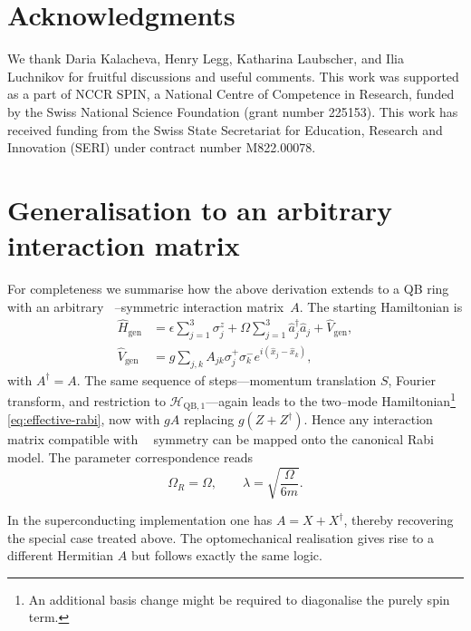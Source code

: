 \documentclass[reprint, aps, prx, amsmath, amssymb, longbibliography, superscriptaddress]{revtex4-2}
\DeclareMathOperator{\Zthree}{\mathbb{Z}_3}
\begin{document}
\section*{Acknowledgments} 

We thank Daria Kalacheva, Henry Legg, Katharina Laubscher, and Ilia Luchnikov for fruitful discussions and useful comments. This work was supported as a part of NCCR SPIN, a National Centre of Competence in Research, funded by the Swiss National Science Foundation (grant number 225153). This work has received funding from the Swiss State Secretariat for Education, Research and Innovation (SERI) under contract number M822.00078.


\appendix

\section{Generalisation to an arbitrary interaction matrix}
\label{app:arbitrary-interaction-summary}

For completeness we summarise how the above derivation extends to a QB ring
with an arbitrary $\Zthree$--symmetric interaction matrix~$A$.  The starting
Hamiltonian is
\begin{equation}
\label{eq:arbitary-interaction-hamiltonian}
  \begin{aligned}
    \hat H_{\text{gen}} &= \epsilon \sum_{j=1}^{3} \sigma_j^z
      + \Omega \sum_{j=1}^{3} \hat a_j^{\dagger} \hat a_j + \hat V_{\text{gen}},
      \\
    \hat V_{\text{gen}} &= g \sum_{j,k} A_{jk}
      \sigma_j^{+} \sigma_k^{-} e^{ i ( \hat x_j - \hat x_k ) },
  \end{aligned}
\end{equation}
with $A^{\dagger}=A$.  The same sequence of steps---momentum translation $S$,
Fourier transform, and restriction to $\mathcal H_{\text{QB},1}$---again leads
to the two--mode Hamiltonian\footnote{An additional basis change might be
required to diagonalise the purely spin term.}
\eqref{eq:effective-rabi}, now with $gA$ replacing $g(Z+Z^{\dagger})$.  Hence any
interaction matrix compatible with $\Zthree$ symmetry can be mapped onto the
canonical Rabi model.  The parameter correspondence reads
\begin{equation}
  \Omega_R = \Omega, \qquad \lambda = \sqrt{ \frac{\Omega}{6 m} }.
\end{equation}

In the superconducting implementation one has $A = X + X^{\dagger}$, thereby
recovering the special case treated above.  The optomechanical realisation
gives rise to a different Hermitian $A$ but follows exactly the same logic.
\end{document}
